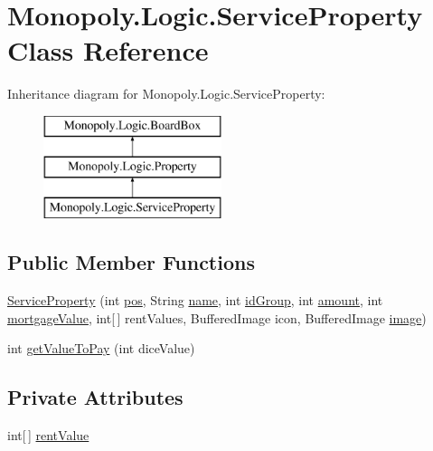 \hypertarget{class_monopoly_1_1_logic_1_1_service_property}{}\section{Monopoly.\+Logic.\+Service\+Property Class Reference}
\label{class_monopoly_1_1_logic_1_1_service_property}
Inheritance diagram for Monopoly.\+Logic.\+Service\+Property\+:\begin{figure}[H]
\begin{center}
\leavevmode
\includegraphics[height=3.000000cm]{class_monopoly_1_1_logic_1_1_service_property}
\end{center}
\end{figure}
\subsection*{Public Member Functions}
\begin{DoxyCompactItemize}
\item 
\hyperlink{class_monopoly_1_1_logic_1_1_service_property_a75591f31b4e294f849b9fe8e2f1b9cc2}{Service\+Property} (int \hyperlink{class_monopoly_1_1_logic_1_1_board_box_a750c8300a134809e0eb5772b3ba92258}{pos}, String \hyperlink{class_monopoly_1_1_logic_1_1_board_box_ad5cd8d9fc191dc2df82b9fe7766210fd}{name}, int \hyperlink{class_monopoly_1_1_logic_1_1_property_ab42a31cd99e909728aa49c0184f644b8}{id\+Group}, int \hyperlink{class_monopoly_1_1_logic_1_1_property_a3e5525c94c56e900372c5a13a8fe03fb}{amount}, int \hyperlink{class_monopoly_1_1_logic_1_1_property_ae4b874ede5de05f1f5b0ab329c2c58f5}{mortgage\+Value}, int\mbox{[}$\,$\mbox{]} rent\+Values, Buffered\+Image icon, Buffered\+Image \hyperlink{class_monopoly_1_1_logic_1_1_board_box_a7d9f613b72c69740867388b59649d127}{image})
\item 
int \hyperlink{class_monopoly_1_1_logic_1_1_service_property_acb9a00536f73267802d71fd582581976}{get\+Value\+To\+Pay} (int dice\+Value)
\end{DoxyCompactItemize}
\subsection*{Private Attributes}
\begin{DoxyCompactItemize}
\item 
int\mbox{[}$\,$\mbox{]} \hyperlink{class_monopoly_1_1_logic_1_1_service_property_ab03c954de837e6c827ed4646170ffbb9}{rent\+Value}
\end{DoxyCompactItemize}
